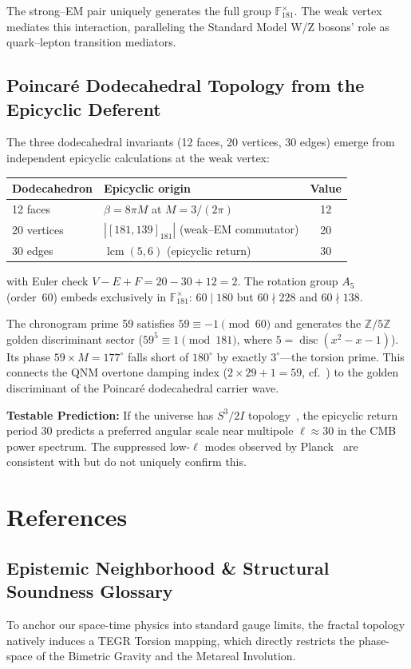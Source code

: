 The strong--EM pair uniquely generates the full group $\mathbb{F}_{181}^{\times}$. The weak vertex mediates this interaction, paralleling the Standard Model W/Z bosons' role as quark--lepton transition mediators.

\subsection{Poincar\'{e} Dodecahedral Topology from the Epicyclic Deferent}

The three dodecahedral invariants (12 faces, 20 vertices, 30 edges) emerge from independent epicyclic calculations at the weak vertex:
\begin{center}
\begin{tabular}{llc}
\hline
Dodecahedron & Epicyclic origin & Value \\
\hline
12 faces & $\beta = 8\pi M$ at $M = 3/(2\pi)$ & 12 \\
20 vertices & $|[181,139]_{181}|$ (weak--EM commutator) & 20 \\
30 edges & $\operatorname{lcm}(5, 6)$ (epicyclic return) & 30 \\
\hline
\end{tabular}
\end{center}
with Euler check $V - E + F = 20 - 30 + 12 = 2$. The rotation group $A_5$ (order~60) embeds exclusively in $\mathbb{F}_{181}^{\times}$: $60 \mid 180$ but $60 \nmid 228$ and $60 \nmid 138$.

The chronogram prime 59 satisfies $59 \equiv -1 \pmod{60}$ and generates the $\mathbb{Z}/5\mathbb{Z}$ golden discriminant sector ($59^5 \equiv 1 \pmod{181}$, where $5 = \operatorname{disc}(x^2 - x - 1)$). Its phase $59 \times M = 177^{\circ}$ falls short of $180^{\circ}$ by exactly $3^{\circ}$---the torsion prime. This connects the QNM overtone damping index ($2 \times 29 + 1 = 59$, cf.~\cite{hod1998, motl2003}) to the golden discriminant of the Poincar\'{e} dodecahedral carrier wave.

\textbf{Testable Prediction:} If the universe has $S^3/2I$ topology~\cite{luminet2003}, the epicyclic return period 30 predicts a preferred angular scale near multipole $\ell \approx 30$ in the CMB power spectrum. The suppressed low-$\ell$ modes observed by Planck~\cite{planck2020} are consistent with but do not uniquely confirm this.

\section{References}

\subsection*{Epistemic Neighborhood \& Structural Soundness Glossary}
To anchor our space-time physics into standard gauge limits, the fractal topology natively induces a TEGR Torsion mapping, which directly restricts the phase-space of the Bimetric Gravity and the Metareal Involution.


